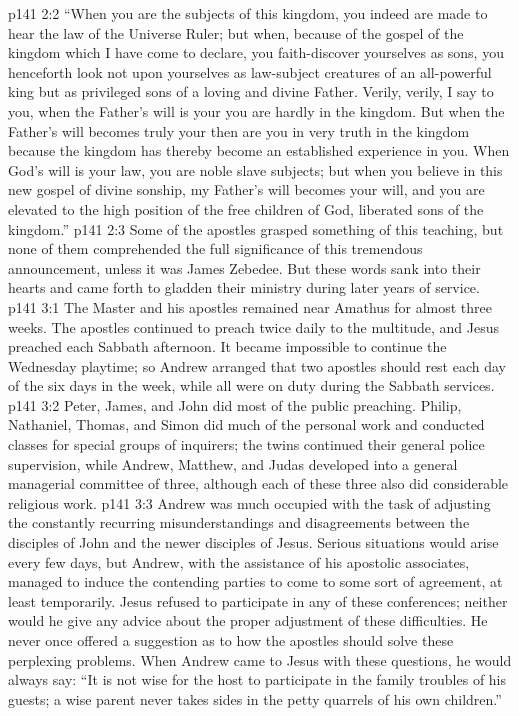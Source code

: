 \vs p141 2:2 \textcolor{ubdarkred}{“When you are the subjects of this kingdom, you indeed are made to hear the law of the Universe Ruler; but when, because of the gospel of the kingdom which I have come to declare, you faith\hyp{}discover yourselves as sons, you henceforth look not upon yourselves as law\hyp{}subject creatures of an all\hyp{}powerful king but as privileged sons of a loving and divine Father. Verily, verily, I say to you, when the Father’s will is your  you are hardly in the kingdom. But when the Father’s will becomes truly your  then are you in very truth in the kingdom because the kingdom has thereby become an established experience in you. When God’s will is your law, you are noble slave subjects; but when you believe in this new gospel of divine sonship, my Father’s will becomes your will, and you are elevated to the high position of the free children of God, liberated sons of the kingdom.”}\plusone
\vs p141 2:3 Some of the apostles grasped something of this teaching, but none of them comprehended the full significance of this tremendous announcement, unless it was James Zebedee. But these words sank into their hearts and came forth to gladden their ministry during later years of service.
\vs p141 3:1 The Master and his apostles remained near Amathus for almost three weeks. The apostles continued to preach twice daily to the multitude, and Jesus preached each Sabbath afternoon. It became impossible to continue the Wednesday playtime; so Andrew arranged that two apostles should rest each day of the six days in the week, while all were on duty during the Sabbath services.
\vs p141 3:2 Peter, James, and John did most of the public preaching. Philip, Nathaniel, Thomas, and Simon did much of the personal work and conducted classes for special groups of inquirers; the twins continued their general police supervision, while Andrew, Matthew, and Judas developed into a general managerial committee of three, although each of these three also did considerable religious work.
\vs p141 3:3 Andrew was much occupied with the task of adjusting the constantly recurring misunderstandings and disagreements between the disciples of John and the newer disciples of Jesus. Serious situations would arise every few days, but Andrew, with the assistance of his apostolic associates, managed to induce the contending parties to come to some sort of agreement, at least temporarily. Jesus refused to participate in any of these conferences; neither would he give any advice about the proper adjustment of these difficulties. He never once offered a suggestion as to how the apostles should solve these perplexing problems. When Andrew came to Jesus with these questions, he would always say: \textcolor{ubdarkred}{“It is not wise for the host to participate in the family troubles of his guests; a wise parent never takes sides in the petty quarrels of his own children.”}
